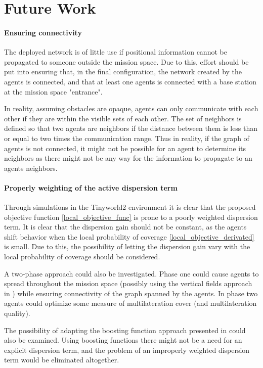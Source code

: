 \section{Future Work}
\paragraph{Ensuring connectivity}
The deployed network is of little use if positional information cannot be propagated to someone outside the mission space.
Due to this, effort should be put into ensuring that, in the final configuration, the network created by the agents 
is connected, and that at least one agents is connected with a base station at the mission space "entrance".

In reality, assuming obstacles are opaque, agents can only communicate with each other if they are within the visible sets of each other. 
The set of neighbors is defined so that two agents are neighbors if the distance between them is less than or equal to two times the communication range.
Thus in reality, if the graph of agents is not connected, it might not be possible for an agent to determine its neighbors as there might not be any way for 
the information to propagate to an agents neighbors.

\paragraph{Properly weighting of the active dispersion term}
Through simulations in the Tinyworld2 environment it is clear that the proposed objective function \eqref{local_objective_func} is 
prone to a poorly weighted dispersion term. It is clear that the dispersion gain should not be constant, 
as the agents shift behavior when the local probability of coverage \eqref{local_objective_derivated} is small. Due to this,
the possibility of letting the dispersion gain vary with the local probability of coverage should be considered. 

A two-phase 
approach could also be investigated. Phase one could cause agents to spread throughout the mission space (possibly using the vertical fields
approach in \cite{pot_field}) while ensuring connectivity of the graph spanned by the agents. In phase two agents could optimize some
measure of multilateration cover (and multilateration quality).

The possibility of adapting the boosting function approach presented in \cite{sun2014escaping} could also be examined. Using boosting
functions there might not be a need for an explicit dispersion term, and the problem of an improperly weighted dispersion term
would be eliminated altogether.

